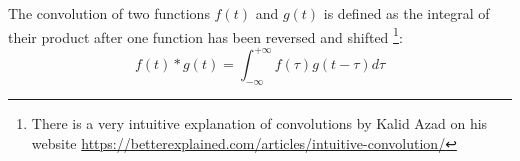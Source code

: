\begin{remark}[Convolution]
    The convolution of two functions $f(t)$ and $g(t)$ is defined as the integral of their product after one function has been reversed and shifted \footnote{There is a very intuitive explanation of convolutions by Kalid Azad on his website \url{https://betterexplained.com/articles/intuitive-convolution/}}:
    \[f(t) \ast g(t)= \int_{-\infty}^{+\infty}f(\tau)g(t-\tau) d\tau\]

\end{remark}
